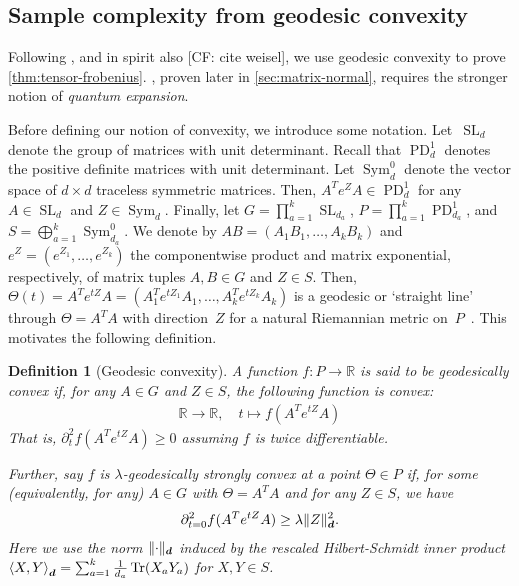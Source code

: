 \documentclass{article}
\newtheorem{definition}{Definition}
\DeclarePairedDelimiter{\norm}{\lVert}{\rVert}
\newcommand{\R}{{\mathbb{R}}}
\renewcommand{\vec}{\bm}
\newcommand\SL{\operatorname{SL}}
\newcommand\PD{\operatorname{PD}}
\newcommand\Sym{\operatorname{Sym}}
\newcommand\tr{\operatorname{Tr}}
\newcommand{\CF}[1]{{\color{purple}[CF: #1]}}
\begin{document}
\subsection{Sample complexity from geodesic convexity}\label{subsec:outline}
Following \cite{FM20}, and in spirit also \CF{cite weisel}, we use geodesic convexity to prove \cref{thm:tensor-frobenius}.
, proven later in \cref{sec:matrix-normal}, requires the stronger notion of \emph{quantum expansion}.

Before defining our notion of convexity, we introduce some notation.
Let~$\SL_d$ denote the group of matrices with unit determinant.
Recall that $\PD_d^1$ denotes the positive definite matrices with unit determinant.
Let $\Sym_d^0$ denote the vector space of $d\times d$ traceless symmetric matrices.
Then, $A^T e^Z A \in \PD_d^1$ for any $A \in \SL_d$ and $Z\in\Sym_d$.
Finally, let $G = \prod_{a=1}^k \SL_{d_a}$, $P = \prod_{a=1}^k \PD_{d_a}^1$, and $S = \bigoplus_{a=1}^k \Sym_{d_a}^0$.
We denote by $AB=(A_1B_1,\dots,A_kB_k)$ and $e^Z=(e^{Z_1},\dots,e^{Z_k})$ the componentwise product and matrix exponential, respectively, of matrix tuples $A, B \in G$ and $Z\in S$.
Then, $\Theta(t) = A^T e^{tZ} A = (A_1^T e^{t Z_1} A_1, \dots, A_k^T e^{t Z_k} A_k)$ is a geodesic or `straight line' through $\Theta = A^T A$ with direction~$Z$ for a natural Riemannian metric on~$P$~\cite{bhatia2009positive}.
This motivates the following definition.

\begin{definition}[Geodesic convexity]
A function $f\colon P \to \R$ is said to be \emph{geodesically convex} if, for any $A \in G$ and $Z \in S$, the following function is convex:
\begin{align*}
  \R \to \R, \quad t \mapsto f(A^T e^{t Z} A)
\end{align*}
That is, $\partial^2_t f(A^T e^{t Z} A) \geq 0$ assuming $f$ is twice differentiable.

Further, say $f$ is \emph{$\lambda$-geodesically strongly convex} at a point $\Theta \in P$ if, for some (equivalently, for any) $A \in G$ with $\Theta = A^T A$ and for any $Z \in S$, we have
\begin{align*}
  \partial^2_{t=0} f(A^T e^{t Z} A) \geq \lambda \norm{Z}_{\vec d}^2.
\end{align*}
Here we use the norm $\norm{\cdot}_{\vec d}$ induced by the rescaled Hilbert-Schmidt inner product $\braket{X, Y}_{\vec d} = \sum_{a=1}^k \frac1{d_a} \tr(X_a Y_a)$ for $X, Y \in S$.
\end{definition}
\end{document}
